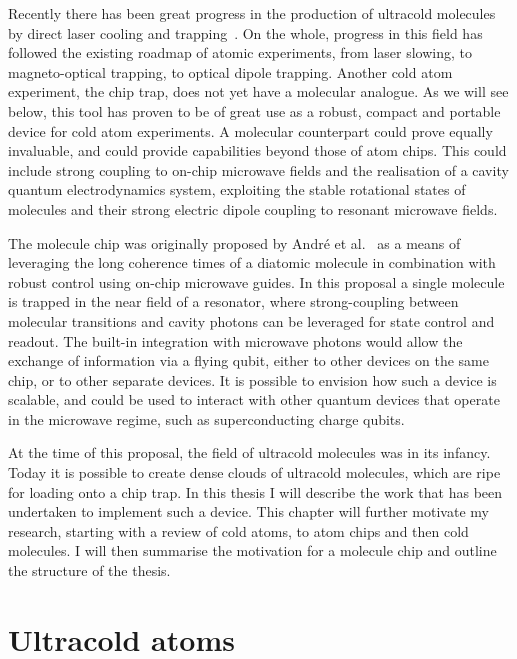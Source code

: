 
Recently there has been great progress in the production of ultracold
molecules by direct laser cooling and trapping~\cite{Fitch2021}. On the whole,
progress in this field has followed the existing roadmap of atomic experiments,
from laser slowing, to magneto-optical trapping, to optical dipole trapping.
Another cold atom experiment, the chip trap, does not yet have a molecular
analogue. As we will see below, this tool has proven to be of great use as a
robust, compact and portable device for cold atom experiments. A molecular
counterpart could prove equally invaluable, and could provide capabilities
beyond those of atom chips.  This could include strong coupling to on-chip
microwave fields and  the realisation of a cavity quantum electrodynamics
system, exploiting the stable rotational states of molecules and their strong
electric dipole coupling to resonant microwave fields.

The molecule chip was originally proposed by Andr\'e et al.~\cite{Andre2006} as
a means of leveraging the long coherence times of a diatomic molecule in
combination with robust control using on-chip microwave guides. In this
proposal a single molecule is trapped in the near field of a resonator, where
strong-coupling between molecular transitions and cavity photons can be
leveraged for state control and readout. The built-in integration with
microwave photons would allow the exchange of information via a flying qubit,
either to other devices on the same chip, or to other separate devices.
%
It is possible to envision how such a device is scalable, and could be used to 
interact with other quantum devices that operate in the microwave regime, such
as superconducting charge qubits.

At the time of this proposal, the field of ultracold molecules was in its
infancy. Today it is possible to create dense clouds of ultracold molecules,
which are ripe for loading onto a chip trap. In this thesis I will describe the
work that has been undertaken to implement such a device. This chapter will
further motivate my research, starting with a review of cold atoms, to atom
chips and then cold molecules. I will then summarise the motivation for a
molecule chip and outline the structure of the thesis.

\section{Ultracold atoms}
\label{intro:atoms}

